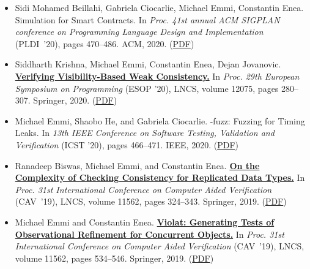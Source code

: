 \documentclass{article}
\begin{document}
  \begin{itemize}[leftmargin=0cm,label={}]

    \item Sidi Mohamed Beillahi, Gabriela Ciocarlie, Michael Emmi, Constantin Enea. {\bfBehavioral Simulation for Smart Contracts.} In \emph{ Proc. 41st annual ACM SIGPLAN conference on Programming Language Design and Implementation } (PLDI ’20), pages 470–486. ACM, 2020. (\href{https://michael-emmi.github.io/https://github.com/michael-emmi/research-papers/raw/master/conf-pldi-BeillahiCEE20.pdf}{PDF})


    \item Siddharth Krishna, Michael Emmi, Constantin Enea, Dejan Jovanovic. {\bf\href{%
    https://doi.org/10.1007/978-3-030-44914-8_11}{%
    Verifying Visibility-Based Weak Consistency.}} In \emph{ Proc. 29th European Symposium on Programming } (ESOP ’20), LNCS, volume 12075, pages 280–307. Springer, 2020. (\href{https://michael-emmi.github.io/https://github.com/michael-emmi/research-papers/raw/master/conf-esop-KrishnaEEJ20.pdf}{PDF})


    \item Michael Emmi, Shaobo He, and Gabriela Ciocarlie. {\bfct-fuzz: Fuzzing for Timing Leaks.} In \emph{ 13th IEEE Conference on Software Testing, Validation and Verification } (ICST ’20), pages 466–471. IEEE, 2020. (\href{https://michael-emmi.github.io/https://github.com/michael-emmi/research-papers/raw/master/conf-icst-HeEC20.pdf}{PDF})


    \item Ranadeep Biswas, Michael Emmi, and Constantin Enea. {\bf\href{%
    https://doi.org/10.1007/978-3-030-25543-5_19}{%
    On the Complexity of Checking Consistency for Replicated Data Types.}} In \emph{ Proc. 31st International Conference on Computer Aided Verification } (CAV ’19), LNCS, volume 11562, pages 324–343. Springer, 2019. (\href{https://michael-emmi.github.io/https://github.com/michael-emmi/research-papers/raw/master/conf-cav-BiswasEE19.pdf}{PDF})


    \item Michael Emmi and Constantin Enea. {\bf\href{%
    https://doi.org/10.1007/978-3-030-25543-5_30}{%
    Violat: Generating Tests of Observational Refinement for Concurrent Objects.}} In \emph{ Proc. 31st International Conference on Computer Aided Verification } (CAV ’19), LNCS, volume 11562, pages 534–546. Springer, 2019. (\href{https://michael-emmi.github.io/https://github.com/michael-emmi/research-papers/raw/master/conf-cav-EmmiE19.pdf}{PDF})



\end{itemize}
\end{document}
